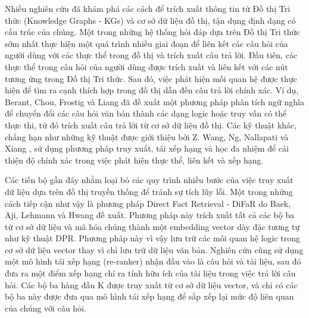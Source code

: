 Nhiều nghiên cứu đã khám phá các cách để trích xuất thông tin từ Đồ thị Tri thức (Knowledge Graphs - KGs) và cơ sở dữ liệu đồ thị, tận dụng định dạng có cấu trúc của chúng. Một trong những hệ thống hỏi đáp dựa trên Đồ thị Tri thức sớm nhất thực hiện một quá trình nhiều giai đoạn để liên kết các câu hỏi của người dùng với các thực thể trong đồ thị và trích xuất câu trả lời. Đầu tiên, các thực thể trong câu hỏi của người dùng được trích xuất và liên kết với các nút tương ứng trong Đồ thị Tri thức. Sau đó, việc phát hiện mối quan hệ được thực hiện để tìm ra cạnh thích hợp trong đồ thị dẫn đến câu trả lời chính xác. Ví dụ, Berant, Chou, Frostig và Liang \cite{berant2013semantic} đã đề xuất một phương pháp phân tích ngữ nghĩa để chuyển đổi các câu hỏi văn bản thành các dạng logic hoặc truy vấn có thể thực thi, từ đó trích xuất câu trả lời từ cơ sở dữ liệu đồ thị. Các kỹ thuật khác, chẳng hạn như những kỹ thuật được giới thiệu bởi Z. Wang, Ng, Nallapati và Xiang \cite{wang2021retrieval}, sử dụng phương pháp truy xuất, tái xếp hạng và học đa nhiệm để cải thiện độ chính xác trong việc phát hiện thực thể, liên kết và xếp hạng.

Các tiến bộ gần đây nhằm loại bỏ các quy trình nhiều bước của việc truy xuất dữ liệu dựa trên đồ thị truyền thống để tránh sự tích lũy lỗi. Một trong những cách tiếp cận như vậy là phương pháp Direct Fact Retrieval - DiFaR do Baek, Aji, Lehmann và Hwang \cite{baek2023direct} đề xuất. Phương pháp này trích xuất tất cả các bộ ba từ cơ sở dữ liệu và mã hóa chúng thành một embedding vector dày đặc tương tự như kỹ thuật DPR. Phương pháp này vì vậy lưu trữ các mối quan hệ logic trong cơ sở dữ liệu vector thay vì chỉ lưu trữ dữ liệu văn bản. Nghiên cứu cũng sử dụng một mô hình tái xếp hạng (re-ranker) nhận đầu vào là câu hỏi và tài liệu, sau đó đưa ra một điểm xếp hạng chỉ ra tính hữu ích của tài liệu trong việc trả lời câu hỏi. Các bộ ba hàng đầu K được truy xuất từ cơ sở dữ liệu vector, và chỉ có các bộ ba này được đưa qua mô hình tái xếp hạng để sắp xếp lại mức độ liên quan của chúng với câu hỏi.

